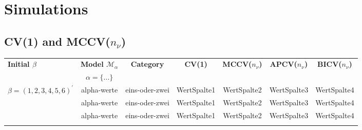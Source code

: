 \documentclass[Research_Module_ES.tex]{subfiles}
\begin{document}
\section{Simulations}

\subsection{CV(1) and MCCV($n_{\nu}$)}
\begin{table}[htb]
	\begin{tabular}{lcccccc}
		\toprule
		\midrule
		\textbf{\scriptsize Initial $\beta$}
		&\textbf{\scriptsize Model $\mathcal{M}_\alpha$}&\textbf{\scriptsize Category}
		&\textbf{\scriptsize CV(1)}
		&\textbf{\scriptsize MCCV($n_\nu$)}
		&\textbf{\scriptsize APCV($n_\nu$)}
		&\textbf{\scriptsize BICV($n_\nu$)}\\
		$~$ &\textbf{\scriptsize $\alpha=\{...\}$} 
		\\\midrule\midrule
		
		{\scriptsize $\beta=(1,2,3,4,5,6)^\prime$}& \scriptsize alpha-werte & \scriptsize eins-oder-zwei &\scriptsize WertSpalte1 & \scriptsize WertSpalte2 &\scriptsize WertSpalte3 & \scriptsize WertSpalte4\\
		
		~& \scriptsize alpha-werte & \scriptsize eins-oder-zwei &\scriptsize WertSpalte1 & \scriptsize WertSpalte2 &\scriptsize WertSpalte3 & \scriptsize WertSpalte4\\
		
		~& \scriptsize alpha-werte &\scriptsize eins-oder-zwei & \scriptsize WertSpalte1 &\scriptsize WertSpalte2 & \scriptsize WertSpalte3 &\scriptsize WertSpalte4\\
		& & & & & &\\
		

\end{tabular}
\end{table}
\end{document}

